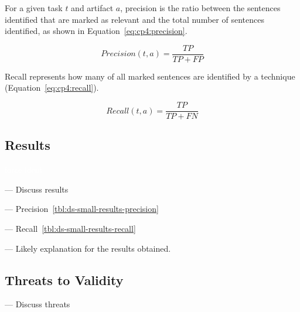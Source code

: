 



For a given task $t$ and artifact $a$, precision is the ratio between the sentences identified that are marked as relevant and the total number of sentences identified, as shown in Equation~\ref{eq:cp4:precision}.


\begin{equation}
\label{eq:cp4:precision}    
    Precision(t, a) = \frac{TP}{TP + FP}
\end{equation}


Recall represents how many of all marked sentences are identified by a technique (Equation~\ref{eq:cp4:recall}).



\begin{equation}
\label{eq:cp4:recall}        
    Recall(t, a) = \frac{TP}{TP + FN}
\end{equation}

\vspace{3mm}




\subsection{Results}
\textcolor{white}{force ident} %


--- Discuss results \vspace{3mm}



--- Precision~\ref{tbl:ds-small-results-precision} \vspace{3mm}


--- Recall~\ref{tbl:ds-small-results-recall} \vspace{3mm}

--- Likely explanation for the results obtained.










\subsection{Threats to Validity}

--- Discuss threats \vspace{3mm}






